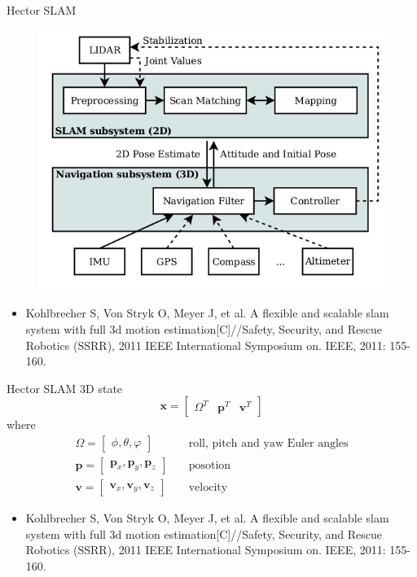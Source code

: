 \documentclass[14pt,hyperref={CJKbookmarks=true}]{beamer}
\theoremstyle{plain}
\theoremstyle{definition}
\theoremstyle{remark}
\begin{document}
\begin{frame}{Hector SLAM}
\begin{figure}
\centering
\includegraphics[width=0.5\linewidth]{hector-slam-system.png}
\end{figure}
\begin{itemize}\tiny 
\item Kohlbrecher S, Von Stryk O, Meyer J, et al. A flexible and scalable slam system with full 3d motion estimation[C]//Safety, Security, and Rescue Robotics (SSRR), 2011 IEEE International Symposium on. IEEE, 2011: 155-160.
\end{itemize}
\end{frame}

\begin{frame}{Hector SLAM}
3D state 
\begin{equation*}
\mathbf{x}=\begin{bmatrix}
\Omega^T & \mathbf{p}^T & \mathbf{v}^T
\end{bmatrix}  
\end{equation*}
where 
\begin{equation*}
\begin{split}
\Omega=\begin{bmatrix}
\phi,\theta,\varphi
\end{bmatrix} &\quad
\text{roll, pitch and yaw Euler angles}\\
\mathbf{p}=\begin{bmatrix}
\mathbf{p}_x,\mathbf{p}_y,\mathbf{p}_z
\end{bmatrix} &\quad
\text{posotion}\\
\mathbf{v}=\begin{bmatrix}
\mathbf{v}_x,\mathbf{v}_y,\mathbf{v}_z
\end{bmatrix} &\quad
\text{velocity}
\end{split}
\end{equation*} 
\begin{itemize}\tiny 
\item Kohlbrecher S, Von Stryk O, Meyer J, et al. A flexible and scalable slam system with full 3d motion estimation[C]//Safety, Security, and Rescue Robotics (SSRR), 2011 IEEE International Symposium on. IEEE, 2011: 155-160.
\end{itemize}
\end{frame}
\end{document}

